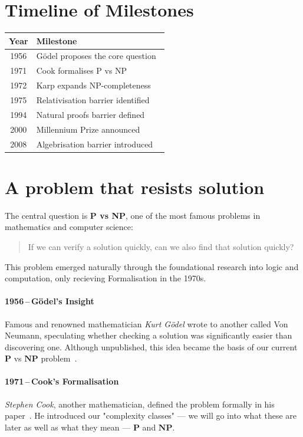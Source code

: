 \documentclass[12pt]{report}
\begin{document}
\section*{Timeline of Milestones}
\begin{center}
\begin{tabularx}{\textwidth}{|c|X|}
\hline
\textbf{Year} & \textbf{Milestone} \\
\hline
1956 & Gödel proposes the core question~\cite{godel1956} \\
\hline
1971 & Cook formalises P vs NP~\cite{cook1971} \\
\hline
1972 & Karp expands NP-completeness~\cite{karp1972} \\
\hline
1975 & Relativisation barrier identified~\cite{baker1975} \\
\hline
1994 & Natural proofs barrier defined~\cite{razborov1994} \\
\hline
2000 & Millennium Prize announced~\cite{claymillennium} \\
\hline
2008 & Algebrisation barrier introduced~\cite{arora2009, aaronson2008algebrization} \\
\hline
\end{tabularx}
\end{center}

\section*{A problem that resists solution}
The central question is \textbf{P vs NP}, one of the most famous problems in mathematics and computer science:
\begin{quote}
If we can verify a solution quickly, can we also find that solution quickly?
\end{quote}
This problem emerged naturally through the foundational research into logic and computation, only recieving Formalisation in the 1970s.
\vspace{0.4cm}
\paragraph{1956\,--\,Gödel's Insight}
Famous and renowned mathematician \textit{Kurt Gödel} wrote to another called Von Neumann, speculating whether checking a solution was significantly easier than discovering one.
Although unpublished, this idea became the basis of our current $\mathbf{P}$ vs $\mathbf{NP}$ problem~\cite{godel1956}.

\paragraph{1971\,--\,Cook's Formalisation}
\textit{Stephen Cook}, another mathematician, defined the problem formally in his paper~\cite{cook1971}.
He introduced our "complexity classes" --- we will go into what these are later as well as what they mean --- $\mathbf{P}$ and $\mathbf{NP}$.
\end{document}
